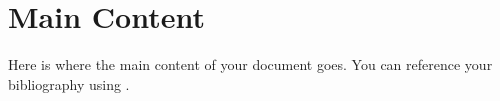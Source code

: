\chapter{Main Content}
    Here is where the main content of your document goes. You can reference your bibliography using \cite{sample2023}.\cite{samplebook2023}\cite{sampleconference2023}